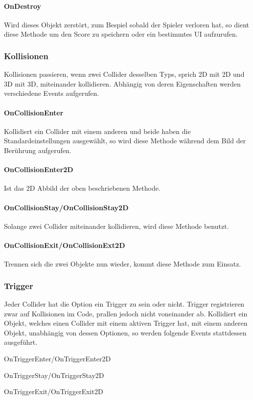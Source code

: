 \paragraph{OnDestroy}
Wird dieses Objekt zerstört, zum Bespiel sobald der Spieler verloren hat, so dient diese Methode um den Score zu speichern oder ein bestimmtes UI aufzurufen.
\subsubsection{Kollisionen}
Kollisionen passieren, wenn zwei Collider desselben Typs, sprich 2D mit 2D und 3D mit 3D, miteinander kollidieren. Abhängig von deren Eigenschaften werden verschiedene Events aufgerufen.
\paragraph{OnCollisionEnter}
Kollidiert ein Collider mit einem anderen und beide haben die Standardeinstellungen ausgewählt, so wird diese Methode während dem Bild der Berührung aufgerufen.
\paragraph{OnCollisionEnter2D}
Ist das 2D Abbild der oben beschriebenen Methode.
\paragraph{OnCollisionStay/OnCollisionStay2D}
Solange zwei Collider miteinander kollidieren, wird diese Methode benutzt.
\paragraph{OnCollisionExit/OnCollisionExt2D}
Trennen sich die zwei Objekte nun wieder, kommt diese Methode zum Einsatz.
\subsubsection{Trigger}
Jeder Collider hat die Option ein Trigger zu sein oder nicht. Trigger registrieren zwar auf Kollisionen im Code, prallen jedoch nicht voneinander ab. Kollidiert ein Objekt, welches einen Collider mit einem aktiven Trigger hat, mit einem anderen Objekt, unabhängig von dessen Optionen, so werden folgende Events stattdessen ausgeführt.
\begin{description}
    \item OnTriggerEnter/OnTriggerEnter2D
    \item OnTriggerStay/OnTriggerStay2D
    \item OnTriggerExit/OnTriggerExit2D
\end{description}
